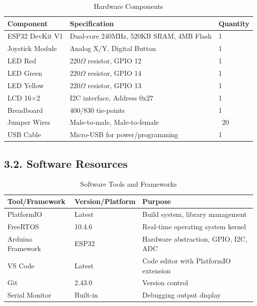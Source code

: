 \documentclass[12pt]{article}
\begin{document}
\begin{table}[H]
	\centering
	\caption{Hardware Components}
	\label{tab:hardware-resources}
	\begin{tabular}{|l|l|l|}
		\hline
		\textbf{Component} & \textbf{Specification} & \textbf{Quantity} \\
		\hline
		ESP32 DevKit V1 & Dual-core 240MHz, 520KB SRAM, 4MB Flash & 1 \\
		\hline
		Joystick Module & Analog X/Y, Digital Button & 1 \\
		\hline
		LED Red & 220$\Omega$ resistor, GPIO 12 & 1 \\
		\hline
		LED Green & 220$\Omega$ resistor, GPIO 14 & 1 \\
		\hline
		LED Yellow & 220$\Omega$ resistor, GPIO 13 & 1 \\
		\hline
		LCD 16×2 & I2C interface, Address 0x27 & 1 \\
		\hline
		Breadboard & 400/830 tie-points & 1 \\
		\hline
		Jumper Wires & Male-to-male, Male-to-female & ~20 \\
		\hline
		USB Cable & Micro-USB for power/programming & 1 \\
		\hline
	\end{tabular}
\end{table}

\subsection*{3.2. Software Resources}

\begin{table}[H]
	\centering
	\caption{Software Tools and Frameworks}
	\label{tab:software-resources}
	\begin{tabular}{|l|l|l|}
		\hline
		\textbf{Tool/Framework} & \textbf{Version/Platform} & \textbf{Purpose} \\
		\hline
		PlatformIO & Latest & Build system, library management \\
		\hline
		FreeRTOS & 10.4.6 & Real-time operating system kernel \\
		\hline
		Arduino Framework & ESP32 & Hardware abstraction, GPIO, I2C, ADC \\
		\hline
		VS Code & Latest & Code editor with PlatformIO extension \\
		\hline
		Git & 2.43.0 & Version control \\
		\hline
		Serial Monitor & Built-in & Debugging output display \\
		\hline
	\end{tabular}
\end{table}
\end{document}
